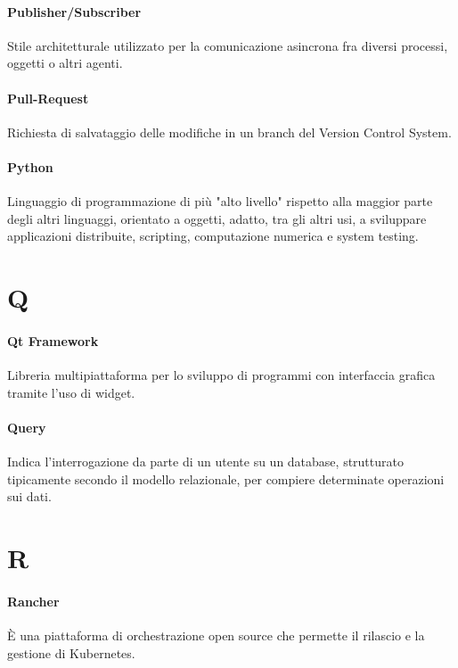 \documentclass[]{article}
\begin{document}
	\paragraph*{Publisher/Subscriber}
	Stile architetturale utilizzato per la comunicazione asincrona fra diversi processi, oggetti o altri agenti.
	
	\paragraph*{Pull-Request}
	Richiesta di salvataggio delle modifiche in un branch del Version Control System.
	
	\paragraph*{Python}
	Linguaggio di programmazione di più "alto livello" rispetto alla maggior parte degli altri linguaggi, orientato a oggetti, adatto, tra gli altri usi, a sviluppare applicazioni distribuite, scripting, computazione numerica e system testing.
	
	
	\newpage
	
	\section*{Q}
	
	\paragraph*{Qt Framework}
	Libreria multipiattaforma per lo sviluppo di programmi con interfaccia grafica tramite l'uso di widget.
	
	\paragraph*{Query}
	Indica l'interrogazione da parte di un utente su un database, strutturato tipicamente secondo il modello relazionale, per compiere determinate operazioni sui dati.
	
	\newpage
	
	\section*{R}
	
	\paragraph*{Rancher}
	È una piattaforma di orchestrazione open source che permette il rilascio e la gestione di Kubernetes.
	
\end{document}
